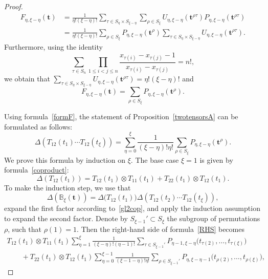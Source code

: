 \documentclass[10pt,a4paper]{amsart}
\numberwithin{equation}{section}
\begin{document}
\begin{proof}
\begin{align*}%
F_{\eta,\xi-\eta}(\boldsymbol{t})&{}=\frac{1}{\eta!(\xi-\eta)!} \sum_{\tau\in S_\eta\times S_{\xi-\eta}} \sum_{\rho\in S_\xi} U_{\eta,\xi-\eta}(\boldsymbol{t}^{\rho\tau}) P_{\eta,\xi-\eta}(\boldsymbol{t}^{\rho\tau})\\
&{}=\frac{1}{\eta!(\xi-\eta)!} \sum_{\rho\in S_\xi} P_{\eta,\xi-\eta}(\boldsymbol{t}^{\rho}) \sum_{\tau\in S_\eta\times S_{\xi-\eta}} U_{\eta,\xi-\eta}(\boldsymbol{t}^{\rho\tau}).
\end{align*}
Furthermore, using the identity
\begin{equation}
\label{n!}
\sum_{\tau\in S_n} \prod_{1\leq i<j\leq n} \frac{x_{\tau(i)}-x_{\tau(j)}-1}{x_{\tau(i)}-x_{\tau(j)}}=n!,
\end{equation}
we obtain that
$
\sum_{\tau\in S_\eta\times S_{\xi-\eta}}U_{\eta,\xi-\eta}(\boldsymbol{t}^{\rho\tau})=\eta!(\xi-\eta)!$
 and
\begin{equation}\label{formF}
F_{\eta,\xi-\eta}(\boldsymbol{t})=\sum_{\rho\in S_\xi} P_{\eta,\xi-\eta}(\boldsymbol{t}^\rho).
\end{equation}

Using formula~\eqref{formF}, the statement of Proposition~\ref{twotensorsA} can be formulated as follows:
\begin{equation}\label{state}
\Delta ( T_{12} (t_{1} ) \cdots T_{12} (t_{\xi} ) )=\sum_{\eta=0}^\xi \frac{1}{(\xi-\eta)!\eta!}\sum_{\rho\in S_\xi} P_{\eta,\xi-\eta}(\boldsymbol{t}^\rho).
\end{equation}
We prove this formula by induction on $\xi$. The base case $\xi=1$ is given by formula~\eqref{coproduct}:
\begin{equation}\label{gl2cop}
\Delta(T_{12} (t_1))=T_{12} (t_1)\otimes T_{11} (t_1)+T_{22} (t_1)\otimes T_{12} (t_1).
\end{equation}
To make the induction step, we use that
\begin{equation}\label{RHS}
\Delta ( {\mathbb{B}}_\xi(\boldsymbol{t}) )=\Delta\bigl(T_{12} (t_1)\bigr) \Delta (T_{12} (t_2)\cdots T_{12} (t_\xi)),
\end{equation}
expand the first factor according to~\eqref{gl2cop}, and apply the induction assumption to expand the second factor. Denote by $S_{\xi-1}'\subset S_\xi$ the subgroup of permutations $\rho$, such that $\rho(1)=1$. Then the right-hand side of formula~\eqref{RHS} becomes{\samepage
\begin{gather}
T_{12} (t_1)\otimes T_{11} (t_1)\sum_{\eta=1}^{\xi}\frac{1}{(\xi-\eta)!(\eta-1)!} \sum_{\tau\in S_{\xi-1}'} P_{\eta-1,\xi-\eta}\bigl(t_{\tau(2)},\dots,t_{\tau(\xi)}\bigr)\nonumber\\
\qquad{}+T_{22} (t_1)\otimes T_{12} (t_1) \sum_{\eta=0}^{\xi-1}\frac{1}{(\xi-1-\eta)!\eta!} \sum_{\rho\in S_{\xi-1}'} P_{\eta,\xi-\eta-1}\bigl(t_{\rho(2)},\dots,t_{\rho(\xi)}\bigr),\label{TTF}
\end{gather}}%


\end{proof}
\end{document}
